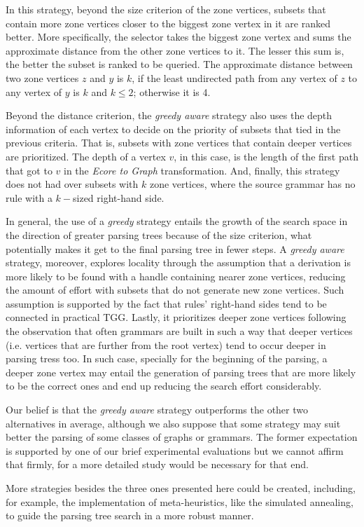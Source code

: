 In this strategy, beyond the size criterion of the zone vertices, subsets that contain more zone vertices closer to the biggest zone vertex in it are ranked better. More specifically, the selector takes the biggest zone vertex and sums the approximate distance from the other zone vertices to it. The lesser this sum is, the better the subset is ranked to be queried. The approximate distance between two zone vertices $z$ and $y$ is $k$, if the least undirected path from any vertex of $z$ to any vertex of $y$ is $k$ and $k \leq 2$; otherwise it is 4.

Beyond the distance criterion, the \textit{greedy aware} strategy also uses the depth information of each vertex to decide on the priority of subsets that tied in the previous criteria. That is, subsets with zone vertices that contain deeper vertices are prioritized. The depth of a vertex $v$, in this case, is the length of the first path that got to $v$ in the \textit{Ecore to Graph} transformation. And, finally, this strategy does not had over subsets with $k$ zone vertices, where the source grammar has no rule with a $k-$sized right-hand side.

In general, the use of a \textit{greedy} strategy entails the growth of the search space in the direction of greater parsing trees because of the size criterion, what potentially makes it get to the final parsing tree in fewer steps. A \textit{greedy aware} strategy, moreover, explores locality through the assumption that a derivation is more likely to be found with a handle containing nearer zone vertices, reducing the amount of effort with subsets that do not generate new zone vertices. Such assumption is supported by the fact that rules' right-hand sides tend to be connected in practical TGG. Lastly, it prioritizes deeper zone vertices following the observation that often grammars are built in such a way that deeper vertices (i.e. vertices that are further from the root vertex) tend to occur deeper in parsing tress too. In such case, specially for the beginning of the parsing, a deeper zone vertex may entail the generation of parsing trees that are more likely to be the correct ones and end up reducing the search effort considerably.

Our belief is that the \textit{greedy aware} strategy outperforms the other two alternatives in average, although we also suppose that some strategy may suit better the parsing of some classes of graphs or grammars. The former expectation is supported by one of our brief experimental evaluations but we cannot affirm that firmly, for a more detailed study would be necessary for that end.

More strategies besides the three ones presented here could be created, including, for example, the implementation of meta-heuristics, like the simulated annealing, to guide the parsing tree search in a more robust manner.



